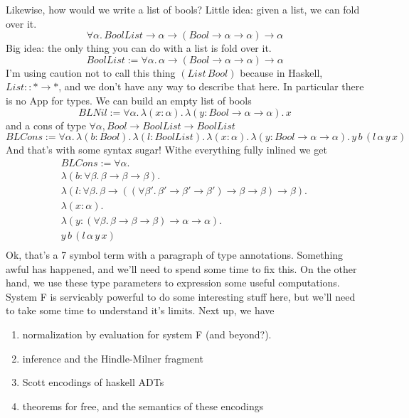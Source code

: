 \documentclass[12pt]{article}
\begin{document}
Likewise, how would we write a list of bools?
Little idea: given a list, we can fold over it.
\[
\forall \alpha.\, BoolList \rightarrow \alpha \rightarrow (Bool \rightarrow \alpha \rightarrow \alpha) \rightarrow \alpha
\]
Big idea: the only thing you can do with a list is fold over it.
\[
BoolList := \forall \alpha.\, \alpha \rightarrow (Bool \rightarrow \alpha \rightarrow \alpha) \rightarrow \alpha
\]
I'm using caution not to call this thing $(List\, Bool)$ because in Haskell, $List :: * \rightarrow *$, and we don't have any way to describe that here.
In particular there is no App for types. 
We can build an empty list of bools
\[
  BLNil := \forall \alpha.\, \lambda (x:\alpha).\,\lambda(y:Bool \rightarrow \alpha \rightarrow \alpha).\, x
\]
and a cons of type $\forall \alpha, Bool \rightarrow BoolList \rightarrow BoolList$
\[
  BLCons := \forall \alpha.\, \lambda (b : Bool).\, \lambda (l : BoolList).\, \lambda (x:\alpha).\,\lambda(y:Bool \rightarrow \alpha \rightarrow \alpha).\, y\, b\, (l\, \alpha \, y\, x)
\]
And that's with some syntax sugar! Withe everything fully inlined we get
\begin{multline}
  BLCons := \forall \alpha.\, \\
\lambda (b : \forall \beta.\, \beta \rightarrow \beta \rightarrow \beta).\,\\ 
\lambda (l : \forall \beta.\, \beta \rightarrow ((\forall \beta'.\, \beta' \rightarrow \beta' \rightarrow \beta') \rightarrow \beta \rightarrow \beta) \rightarrow \beta).\, \\
\lambda (x:\alpha).\,\\
\lambda(y:(\forall \beta.\, \beta \rightarrow \beta \rightarrow \beta) \rightarrow \alpha \rightarrow \alpha).\, \\y\, b\, (l\, \alpha \, y\, x)\\
\end{multline}
Ok, that's a 7 symbol term with a paragraph of type annotations. 
Something awful has happened, and we'll need to spend some time to fix this.
On the other hand, we use these type parameters to expression some useful computations.
System F is servicably powerful to do some interesting stuff here, but we'll need to take some time to understand it's limits.
Next up, we have 
\begin{enumerate}
    \item normalization by evaluation for system F (and beyond?).
    \item inference and the Hindle-Milner fragment
    \item Scott encodings of haskell ADTs
    \item theorems for free, and the semantics of these encodings
\end{enumerate}
\end{document}
